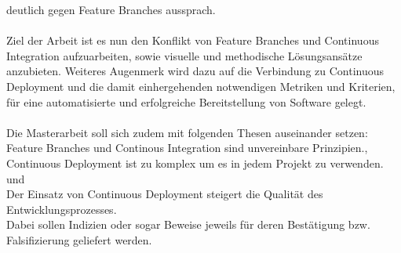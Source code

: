 \documentclass[11pt,english,german]{article}
\begin{document}
deutlich gegen \glqq Feature Branches\grqq{} aussprach.
\\
\\
Ziel der Arbeit ist es nun den Konflikt von \glqq Feature Branches\grqq{}  und \glqq Continuous Integration\grqq{}
aufzuarbeiten, sowie visuelle und methodische Lösungsansätze anzubieten.
Weiteres Augenmerk wird dazu auf die Verbindung zu \glqq Continuous Deployment\grqq{}  und die damit einhergehenden
notwendigen Metriken und Kriterien, für eine automatisierte und erfolgreiche Bereitstellung von Software gelegt.
\\
\\
Die Masterarbeit soll sich zudem mit folgenden Thesen auseinander setzen: \\
\glqq Feature Branches und Continous Integration sind unvereinbare Prinzipien.\grqq{},\\
\glqq Continuous Deployment ist zu komplex um es in jedem Projekt zu verwenden.\grqq{} und\\
\glqq Der Einsatz von Continuous Deployment steigert die Qualität des Entwicklungsprozesses.\grqq{}\\
Dabei sollen Indizien oder sogar Beweise jeweils für deren Bestätigung bzw. Falsifizierung geliefert werden.
\end{document}
